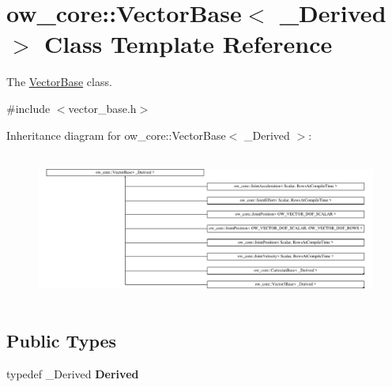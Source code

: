 \hypertarget{classow__core_1_1VectorBase}{}\section{ow\+\_\+core\+:\+:Vector\+Base$<$ \+\_\+\+Derived $>$ Class Template Reference}
\label{classow__core_1_1VectorBase}


The \hyperlink{classow__core_1_1VectorBase}{Vector\+Base} class.  




{\ttfamily \#include $<$vector\+\_\+base.\+h$>$}

Inheritance diagram for ow\+\_\+core\+:\+:Vector\+Base$<$ \+\_\+\+Derived $>$\+:\begin{figure}[H]
\begin{center}
\leavevmode
\includegraphics[height=4.980237cm]{da/d9a/classow__core_1_1VectorBase}
\end{center}
\end{figure}
\subsection*{Public Types}
\begin{DoxyCompactItemize}
\item 
typedef \+\_\+\+Derived {\bfseries Derived}\hypertarget{classow__core_1_1VectorBase_a99f34d0c33ce96eaee393b1011d5a494}{}\label{classow__core_1_1VectorBase_a99f34d0c33ce96eaee393b1011d5a494}

\end{DoxyCompactItemize}
